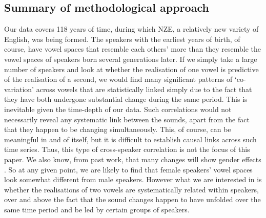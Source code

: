 \documentclass[review]{elsarticle} %
\begin{document}
\subsection{Summary of methodological approach}


Our data covers 118 years of time, during which NZE, a relatively new variety of English, was being formed.  The speakers with the earliest years of birth, of course, have vowel spaces that resemble each others' more than they resemble the vowel spaces of speakers born several generations later.  If we simply take a large number of speakers and look at whether the realisation of one vowel is predictive of the realisation of a second, we would find many significant patterns of `co-variation' across vowels that are statistically linked simply due to the fact that they have both undergone substantial change during the same period. This is inevitable given the time-depth of our data. Such correlations would not necessarily reveal any systematic link between the sounds, apart from the fact that they happen to be changing simultaneously. This, of course, can be meaningful in and of itself, but it is difficult to establish causal links across such time series. Thus, this type of cross-speaker correlation is not the focus of this paper.  We also know, from past work, that many changes will show gender effects \cite{gordon2004new}. So at any given point, we are likely to find that female speakers' vowel spaces look somewhat different from male speakers.
However what we are interested in is whether the realisations of two vowels are systematically related within speakers, over and above the fact that the sound changes happen to have unfolded over the same time period and be led by certain groups of speakers. 
\end{document}
